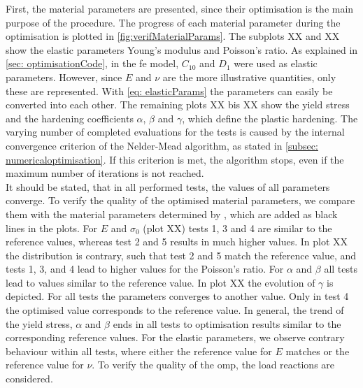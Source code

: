 First, the material parameters are presented, since their optimisation is the main purpose of the procedure. The progress of each material parameter during the optimisation is plotted in \autoref{fig:verifMaterialParams}. The subplots XX and XX show the elastic parameters Young's modulus and Poisson's ratio. As explained in \autoref{sec: optimisationCode}, in the \acrshort{fe} model, $C_{10}$ and $D_1$ were used as elastic parameters. However, since $E$ and $\nu$ are the more illustrative quantities, only these are represented. With \autoref{eq: elasticParams} the parameters can easily be converted into each other.
The remaining plots XX bis XX show the yield stress and the hardening coefficients $\alpha$, $\beta$ and $\gamma$, which define the plastic hardening.
The varying number of completed evaluations for the tests is caused by the internal convergence criterion of the Nelder-Mead algorithm, as stated in \autoref{subsec: numericaloptimisation}. If this criterion is met, the algorithm stops, even if the maximum number of iterations is not reached. \\
\indent It should be stated, that in all performed tests, the values of all parameters converge. 
To verify the quality of the optimised material parameters, we compare them with the material parameters determined by \citet{ries_deciphering_nodate}, which are added as black lines in the plots. 
For $E$ and $\sigma_0$ (plot XX) tests 1, 3 and 4 are similar to the reference values, whereas test 2 and 5 results in much higher values.
In plot XX the distribution is contrary, such that test 2 and 5 match the reference value, and tests 1, 3, and 4 lead to higher values for the Poisson's ratio.
For $\alpha$ and $\beta$ all tests lead to values similar to the reference value.
In plot XX the evolution of $\gamma$ is depicted. For all tests the parameters converges to another value. Only in test 4 the optimised value corresponds to the reference value. 
In general, the trend of the yield stress, $\alpha$ and $\beta$ ends in all tests to optimisation results similar to the corresponding reference values. For the elastic parameters, we observe contrary behaviour within all tests, where either the reference value for $E$ matches or the reference value for $\nu$. To verify the quality of the \acrlong{omp}, the load reactions are considered. 

